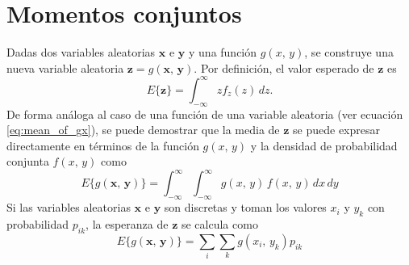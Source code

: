 \documentclass[a4paper]{report}
\newcommand{\x}{\mathbf{x}}
\newcommand{\y}{\mathbf{y}}
\newcommand{\z}{\mathbf{z}}
\begin{document}
\section{Momentos conjuntos}

Dadas dos variables aleatorias \(\x\) e \(\y\) y una función \(g(x,\,y)\), se construye una nueva variable aleatoria \(\z=g(\x,\,\y)\). Por definición, el valor esperado de \(\z\) es
\[
 E\{\z\}=\int_{-\infty}^{\infty}zf_z(z)\,dz.
\]
De forma análoga al caso de una función de una variable aleatoria (ver ecuación \ref{eq:mean_of_gx}), se puede demostrar que la media de \(\z\) se puede expresar directamente en términos de la función \(g(x,\,y)\) y la densidad de probabilidad conjunta \(f(x,\,y)\) como
\begin{equation}\label{eq:mean_of_gxy}
 E\{g(\x,\,\y)\}=\int_{-\infty}^{\infty}\int_{-\infty}^{\infty}g(x,\,y)\,f(x,\,y)\,dx\,dy
\end{equation}
Si las variables aleatorias \(\x\) e \(\y\) son discretas y toman los valores \(x_i\) y \(y_k\) con probabilidad \(p_{ik}\), la esperanza de \(\z\) se calcula como
\[
 E\{g(\x,\,\y)\}=\sum_{i}\sum_{k}g(x_i,\,y_k)p_{ik}
\]
\end{document}
